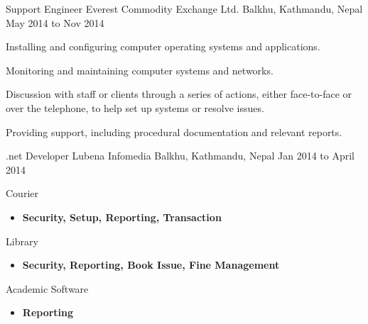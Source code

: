 \begin{cventries}
  \cventry
    {Support Engineer} %
    {Everest Commodity Exchange Ltd.} %
    {Balkhu, Kathmandu, Nepal} %
    {May 2014 to Nov 2014} %
    {
      \begin{cvitems} %
        \item {Installing and configuring computer operating systems and applications.}
        \item {Monitoring and maintaining computer systems and networks.}
        \item{Discussion with staff or clients through a series of actions, either face-to-face or over the telephone, to help set up systems or resolve issues.}
		\item{Providing support, including procedural documentation and relevant reports.}
      \end{cvitems} 
    }

  \cventry
    {.net Developer} %
    {Lubena Infomedia} %
    {Balkhu, Kathmandu, Nepal} %
    {Jan 2014 to April 2014} %
    {
      \begin{cvitems} %
        \item {Courier}
        \begin{itemize}
        \item {\textbf{Security, Setup, Reporting, Transaction}}
        \end{itemize}
        \item {Library}
        \begin{itemize}
        \item {\textbf{Security, Reporting, Book Issue, Fine Management}}
        \end{itemize}
        \item {Academic Software}
        \begin{itemize}
        \item {\textbf{Reporting}}
        \end{itemize}
      \end{cvitems}
    }


\end{cventries}
